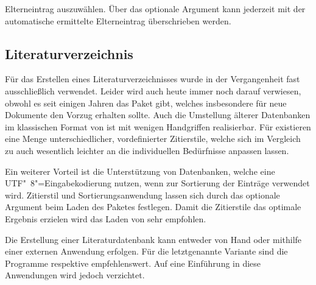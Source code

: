 \documentclass[%
  english,ngerman,%
  cdgeometry=no,DIV=12,%
  cd=false,cdfont=false,cdtitle=true,%
  headings=normal,%
  automark,%
  listof=toc,%
]{tudscrartcl}
\begin{document}
Elterneintrag auszuwählen. Über das optionale Argument kann jederzeit mit 
 der automatische ermittelte 
Elterneintrag überschrieben werden.
%
\begin{Hint}
\newcommand*\symbollettergroup{}
\newcommand*{\newformulasymbol}[5][]{%
  \ifisgreeksymbol{#4}{%
    \renewcommand*{\symbollettergroup}{greekletters}%
  }{%
    \renewcommand*{\symbollettergroup}{romanletters}%
  }%
  \newglossaryentry{#2}{%
    type=symbols,%
    name={#3},%
    description={\nopostdesc},%
    symbol={\ensuremath{#4}},%
    user1={\ensuremath{\mathrm{#5}}},%
    sort={#2},%
    parent={\symbollettergroup},%
    #1%
  }%
}
\end{Hint}



\subsection{%
  Literaturverzeichnis%
  \label{sec:biblatex}%
}

Für das Erstellen eines Literaturverzeichnisses wurde in der Vergangenheit fast 
ausschließlich  verwendet. Leider wird auch heute immer noch 
darauf verwiesen, obwohl es seit einigen Jahren das Paket  
gibt, welches insbesondere für neue Dokumente den Vorzug erhalten sollte. Auch 
die Umstellung älterer Datenbanken im klassischen Format von 
ist mit wenigen Handgriffen realisierbar. Für  existieren 
eine Menge unterschiedlicher, vordefinierter Zitierstile, welche sich im 
Vergleich zu  auch wesentlich leichter an die individuellen 
Bedürfnisse anpassen lassen.

Ein weiterer Vorteil ist die Unterstützung von Datenbanken, welche eine 
UTF"~8"=Eingabekodierung nutzen, wenn  zur Sortierung der 
Einträge verwendet wird. Zitierstil und Sortierungsanwendung lassen sich 
durch das optionale Argument beim Laden des Paketes festlegen. Damit die 
Zitierstile das optimale Ergebnis erzielen wird das Laden von 
 sehr empfohlen.
%
\begin{Preamble}
\usepackage{csquotes}
\usepackage[backend=biber,style=alphabetic]{biblatex}

\end{Preamble}
%
Die Erstellung einer Literaturdatenbank kann entweder von Hand oder mithilfe 
einer externen Anwendung erfolgen. Für die letztgenannte Variante sind die 
Programme  respektive  empfehlenswert. 
Auf eine Einführung in diese Anwendungen wird jedoch verzichtet. 
\end{document}

